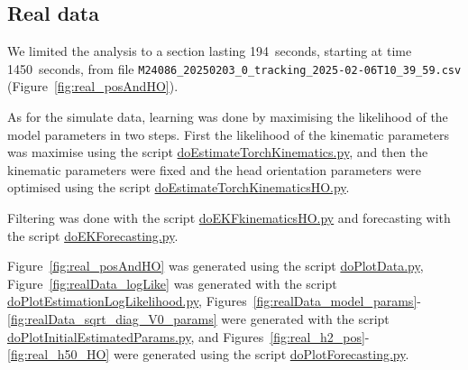 \documentclass[12pt]{article}
\begin{document}
\subsection{Real data}

We limited the analysis to a section lasting 194~seconds, starting at time
1450~seconds, from file
\texttt{M24086\_20250203\_0\_tracking\_2025-02-06T10\_39\_59.csv}
(Figure~\ref{fig:real_posAndHO}).

As for the simulate data, learning was done by maximising the likelihood of the
model parameters in two steps. First the likelihood of the kinematic parameters
was maximise using the script
\href{https://github.com/joacorapela/lds_tracking_posOriMice/blob/master/code/scripts/doEstimateTorchKinematics.py}{doEstimateTorchKinematics.py},
and then the kinematic parameters were fixed and the head orientation
parameters were optimised using the script
\href{https://github.com/joacorapela/lds_tracking_posOriMice/blob/master/code/scripts/doEstimateTorchKinematicsHO.py}{doEstimateTorchKinematicsHO.py}.

Filtering was done with the script
\href{https://github.com/joacorapela/lds_tracking_posOriMice/blob/master/code/scripts/doEKFkinematicsHO.py}{doEKFkinematicsHO.py}
and forecasting with the script
\href{https://github.com/joacorapela/lds_tracking_posOriMice/blob/master/code/scripts/doEKForecasting.py}{doEKForecasting.py}.

Figure~\ref{fig:real_posAndHO} was generated using the script
\href{https://github.com/joacorapela/lds_tracking_posOriMice/blob/master/code/scripts/doPlotData.py}{doPlotData.py},
Figure~\ref{fig:realData_logLike} was generated with the script
\href{https://github.com/joacorapela/lds_tracking_posOriMice/blob/master/code/scripts/doPlotEstimationLogLikelihood.py}{doPlotEstimationLogLikelihood.py},
Figures~\ref{fig:realData_model_params}-\ref{fig:realData_sqrt_diag_V0_params}
were generated with the script
\href{https://github.com/joacorapela/lds_tracking_posOriMice/blob/master/code/scripts/doPlotInitialEstimatedParams.py}{doPlotInitialEstimatedParams.py},
and Figures~\ref{fig:real_h2_pos}-\ref{fig:real_h50_HO} were generated using the script
\href{https://github.com/joacorapela/lds_tracking_posOriMice/blob/master/code/scripts/doPlotForecasting.py}{doPlotForecasting.py}.
\end{document}
